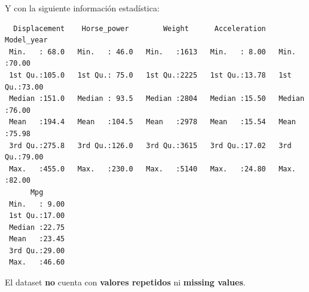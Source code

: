 \vspace{\baselineskip}

Y con la siguiente información estadística:

\begin{verbatim}
  Displacement    Horse_power        Weight      Acceleration     Model_year   
 Min.   : 68.0   Min.   : 46.0   Min.   :1613   Min.   : 8.00   Min.   :70.00  
 1st Qu.:105.0   1st Qu.: 75.0   1st Qu.:2225   1st Qu.:13.78   1st Qu.:73.00  
 Median :151.0   Median : 93.5   Median :2804   Median :15.50   Median :76.00  
 Mean   :194.4   Mean   :104.5   Mean   :2978   Mean   :15.54   Mean   :75.98  
 3rd Qu.:275.8   3rd Qu.:126.0   3rd Qu.:3615   3rd Qu.:17.02   3rd Qu.:79.00  
 Max.   :455.0   Max.   :230.0   Max.   :5140   Max.   :24.80   Max.   :82.00  
      Mpg       
 Min.   : 9.00  
 1st Qu.:17.00  
 Median :22.75  
 Mean   :23.45  
 3rd Qu.:29.00  
 Max.   :46.60  
\end{verbatim}

\vspace{\baselineskip}

El dataset \textbf{no} cuenta con \textbf{valores repetidos} ni \textbf{missing values}.

\vspace{\baselineskip}

